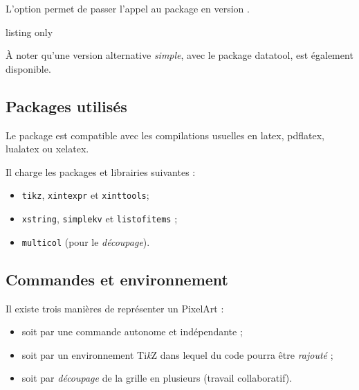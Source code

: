 \documentclass{article}
\newcommand\Cle[1]{{\bfseries\sffamily\textlangle #1\textrangle}}
\begin{document}
\smallskip

L'option \Cle{[csvii]} permet de passer l'appel au package en version .

\begin{PresentationCode}{listing only}
\usepackage{PixelArtTikz}                     %

\usepackage[csvii]{PixelArtTikz}              %
\end{PresentationCode}

À noter qu'une version alternative \textit{simple}, avec le package \textsf{datatool}, est également disponible.

\subsection{Packages utilisés}

Le package est compatible avec les compilations usuelles en \textsf{latex}, \textsf{pdflatex}, \textsf{lualatex} ou \textsf{xelatex}.

\medskip

Il charge les packages et librairies suivantes :

\begin{itemize}
	\item \texttt{tikz}, \texttt{xintexpr} et \texttt{xinttools};
	\item \texttt{xstring}, \texttt{simplekv} et \texttt{listofitems} ;
	\item \texttt{multicol} (pour le \textit{découpage}).
\end{itemize}

\pagebreak

\subsection{Commandes et environnement}

Il existe trois manières de représenter un PixelArt :

\begin{itemize}
	\item soit par une commande autonome et indépendante ;
	\item soit par un environnement Ti\textit{k}Z dans lequel du code pourra être \textit{rajouté} ;
	\item soit par \textit{découpage} de la grille en plusieurs (travail collaboratif).
\end{itemize}
\end{document}
